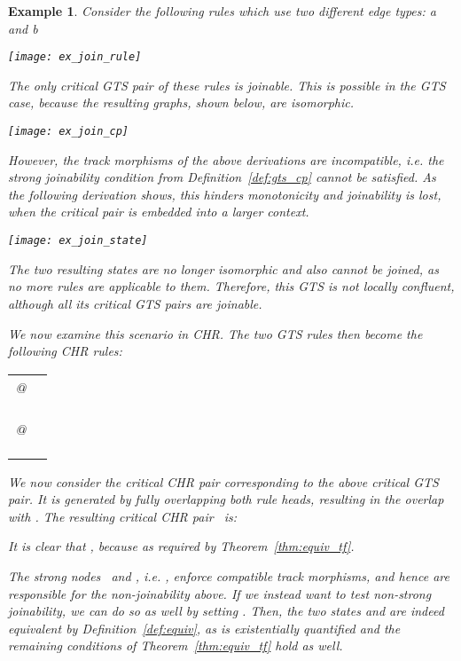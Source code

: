 \documentclass{tlp}
\newtheorem{example}{Example}[section]
\begin{document}
\begin{example}

Consider the following rules which use two different edge types: a and b
\begin{center} 
\texttt{[image: ex\_join\_rule]}
\end{center}

The only critical GTS pair of these rules is joinable. This is possible in the
GTS case, because the resulting graphs, shown below, are isomorphic.

\begin{center}
\texttt{[image: ex\_join\_cp]} 
\end{center}
 

However, the track morphisms of the above derivations are incompatible, i.e. the
strong joinability condition from Definition~\ref{def:gts_cp} cannot be
satisfied. As the following derivation shows, this hinders monotonicity and
joinability is lost, when the critical pair is embedded into a larger context.

\begin{center}
\texttt{[image: ex\_join\_state]} 
\end{center}

The two resulting states are no longer isomorphic and also cannot be joined, as
no more rules are applicable to them. Therefore, this GTS is not locally
confluent, although all its critical GTS pairs are joinable.

We now examine this scenario in CHR. The two GTS rules then become the
following CHR rules:

\begin{center} 
\begin{tabular}{ll}
 @ & 
\\ &  \\
& \\
& \\
 @ & \\ &  \\
& \\
& 
\end{tabular}
\end{center}

We now consider the critical CHR pair corresponding to the above critical GTS
pair. It is generated by fully overlapping both rule heads, resulting in the
overlap  with . The resulting
critical CHR pair~ is:

It is clear that , because  as
required by Theorem~\ref{thm:equiv_tf}.

The strong nodes~ and , i.e. , enforce compatible
track morphisms, and hence are responsible for the non-joinability above. If we
instead want to test non-strong joinability, we can do so as well by setting
. Then, the two states  and  are indeed
equivalent by Definition~\ref{def:equiv}, as  is existentially quantified
and the remaining conditions of Theorem~\ref{thm:equiv_tf} hold as well.
\end{example}
\end{document}
